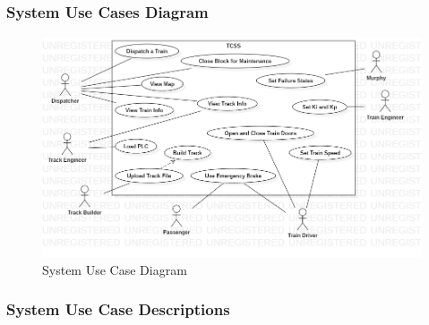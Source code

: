 \documentclass{article}
\begin{document}
    \subsubsection{System Use Cases Diagram}
    \begin{figure}[H]
        \centering
        \includegraphics[width=\textwidth]{./System/System_UseCases.png}
        \caption{System Use Case Diagram}
        \label{fig:system_Use_Cases}
    \end{figure}
    
    \subsubsection{System Use Case Descriptions}
\end{document}

